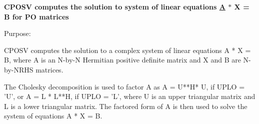 {\bfseries  C\+P\+O\+S\+V computes the solution to system of linear equations \hyperlink{classA}{A} $\ast$ X = B for P\+O matrices} 

 \begin{DoxyParagraph}{Purpose\+: }
\begin{DoxyVerb} CPOSV computes the solution to a complex system of linear equations
    A * X = B,
 where A is an N-by-N Hermitian positive definite matrix and X and B
 are N-by-NRHS matrices.

 The Cholesky decomposition is used to factor A as
    A = U**H* U,  if UPLO = 'U', or
    A = L * L**H,  if UPLO = 'L',
 where U is an upper triangular matrix and  L is a lower triangular
 matrix.  The factored form of A is then used to solve the system of
 equations A * X = B.\end{DoxyVerb}
 
\end{DoxyParagraph}

